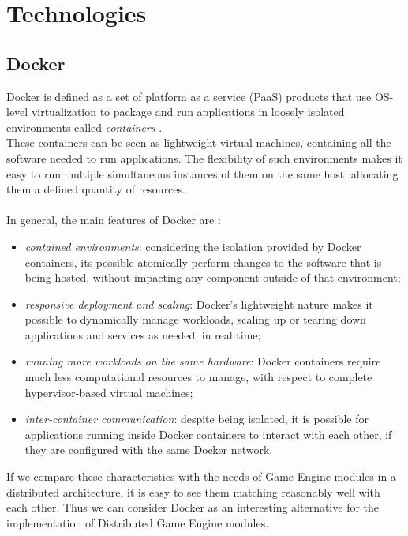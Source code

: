 
\chapter{Technologies}
\label{cap:technologies}

\section{Docker}
Docker is defined as a set of platform as a service (PaaS) products that use OS-level virtualization to package and run applications in loosely isolated environments called \textit{containers} \cite{site:docker-wiki}. \\
These containers can be seen as lightweight virtual machines, containing all the software needed to run applications. The flexibility of such environments makes it easy to run multiple simultaneous instances of them on the same host, allocating them a defined quantity of resources. \\ \\
In general, the main features of Docker are \cite{site:docker-website}:
\begin{itemize}
	\item \textit{contained environments}: considering the isolation provided by Docker containers, its possible atomically perform changes to the software that is being hosted, without impacting any component outside of that environment;
	\item \textit{responsive deployment and scaling}: Docker's lightweight nature makes it possible to dynamically manage workloads, scaling up or tearing down applications and services as needed, in real time;
	\item \textit{running more workloads on the same hardware}: Docker containers require much less computational resources to manage, with respect to complete hypervisor-based virtual machines;
	\item \textit{inter-container communication}: despite being isolated, it is possible for applications running inside Docker containers to interact with each other, if they are configured with the same Docker network.
\end{itemize}
If we compare these characteristics with the needs of Game Engine modules in a distributed architecture, it is easy to see them matching reasonably well with each other. Thus we can consider Docker as an interesting alternative for the implementation of Distributed Game Engine modules.


